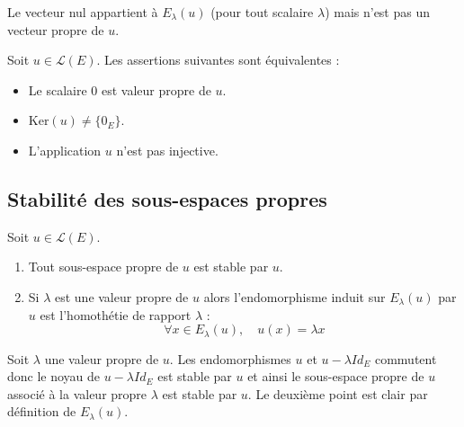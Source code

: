 \documentclass[french,11pt,twoside]{VcCours}
\begin{document}
\begin{Remarque}[\alerte]{} Le vecteur nul appartient à $E_{\lambda}(u)$ (pour tout scalaire $\lambda$) mais n'est pas un vecteur propre de $u$.
\end{Remarque}

%

\begin{Corollaire}{} Soit $u \in \mathcal{L}(E)$. Les assertions suivantes sont équivalentes :

\begin{itemize}
\item Le scalaire $0$ est valeur propre de $u$.
\item $\textrm{Ker}(u) \neq \lbrace 0_E \rbrace$.
\item L'application $u$ n'est pas injective.
\end{itemize}
\end{Corollaire}

\subsection{Stabilité des sous-espaces propres}

\begin{Proposition}{}\label{stab} Soit $u \in \mathcal{L}(E)$. 

\begin{enumerate}
\item Tout sous-espace propre de $u$ est stable par $u$.
\item Si $\lambda$ est une valeur propre de $u$ alors l'endomorphisme induit sur $E_{\lambda}(u)$ par $u$ est l'homothétie de rapport $\lambda$ :
$$ \forall x \in E_{\lambda}(u), \quad u(x) = \lambda x$$
\end{enumerate}
\end{Proposition}

%
%
\begin{Demonstration}{} Soit $\lambda$ une valeur propre de $u$. Les endomorphismes $u$ et $u- \lambda Id_E$ commutent donc le noyau de $u- \lambda Id_E$ est stable par $u$ et ainsi le sous-espace propre de $u$ associé à la valeur propre $\lambda$ est stable par $u$. Le deuxième point est clair par définition de $E_{\lambda}(u)$.
\end{Demonstration}
\end{document}
